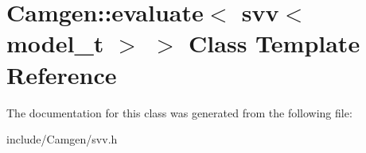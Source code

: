 \hypertarget{a00198}{\section{Camgen\-:\-:evaluate$<$ svv$<$ model\-\_\-t $>$ $>$ Class Template Reference}
\label{a00198}
}


The documentation for this class was generated from the following file\-:\begin{DoxyCompactItemize}
\item 
include/\-Camgen/svv.\-h\end{DoxyCompactItemize}
